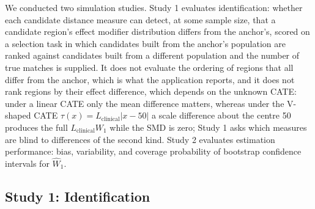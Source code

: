 \documentclass[AMA,Times1COL]{WileyNJDv5}
\begin{document}
We conducted two simulation studies. Study 1 evaluates identification: whether each candidate distance measure can detect, at some sample size, that a candidate region's effect modifier distribution differs from the anchor's, scored on a selection task in which candidates built from the anchor's population are ranked against candidates built from a different population and the number of true matches is supplied. It does not evaluate the ordering of regions that all differ from the anchor, which is what the application reports, and it does not rank regions by their effect difference, which depends on the unknown CATE: under a linear CATE only the mean difference matters, whereas under the V-shaped CATE $\tau(x) = L_{\text{clinical}} |x - 50|$ a scale difference about the centre 50 produces the full $L_{\text{clinical}} W_1$ while the SMD is zero; Study 1 asks which measures are blind to differences of the second kind. Study 2 evaluates estimation performance: bias, variability, and coverage probability of bootstrap confidence intervals for $\widehat{W}_1$.


\subsection{Study 1: Identification}\label{sec:study1}

\end{document}
